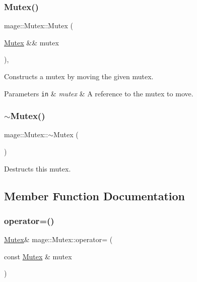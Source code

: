 \subsubsection{\texorpdfstring{Mutex()}{Mutex()}\hspace{0.1cm}{\footnotesize\ttfamily [3/3]}}
{\footnotesize\ttfamily mage\+::\+Mutex\+::\+Mutex (\begin{DoxyParamCaption}\item[{\hyperlink{classmage_1_1_mutex}{Mutex} \&\&}]{mutex }\end{DoxyParamCaption})\hspace{0.3cm}{\ttfamily [default]}, {\ttfamily [noexcept]}}

Constructs a mutex by moving the given mutex.


\begin{DoxyParams}[1]{Parameters}
\mbox{\tt in}  & {\em mutex} & A reference to the mutex to move. \\
\hline
\end{DoxyParams}
\hypertarget{classmage_1_1_mutex_a143d82ec7bb43f953a1703caa7972e9d}{}\label{classmage_1_1_mutex_a143d82ec7bb43f953a1703caa7972e9d} 
\subsubsection{\texorpdfstring{$\sim$\+Mutex()}{~Mutex()}}
{\footnotesize\ttfamily mage\+::\+Mutex\+::$\sim$\+Mutex (\begin{DoxyParamCaption}{ }\end{DoxyParamCaption})}

Destructs this mutex. 

\subsection{Member Function Documentation}
\hypertarget{classmage_1_1_mutex_a56072bdabdeadd5d897de232dbd298a0}{}\label{classmage_1_1_mutex_a56072bdabdeadd5d897de232dbd298a0} 
\subsubsection{\texorpdfstring{operator=()}{operator=()}\hspace{0.1cm}{\footnotesize\ttfamily [1/2]}}
{\footnotesize\ttfamily \hyperlink{classmage_1_1_mutex}{Mutex}\& mage\+::\+Mutex\+::operator= (\begin{DoxyParamCaption}\item[{const \hyperlink{classmage_1_1_mutex}{Mutex} \&}]{mutex }\end{DoxyParamCaption})\hspace{0.3cm}{\ttfamily [delete]}}


